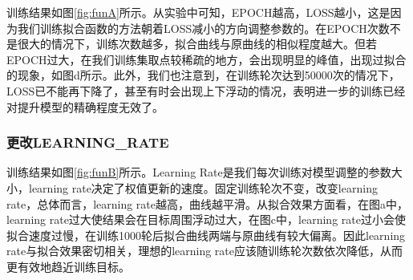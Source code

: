 \documentclass{article}
\begin{document}
训练结果如图\ref{fig:funA}所示。从实验中可知，EPOCH越高，LOSS越小，这是因为我们训练拟合函数的方法朝着LOSS减小的方向调整参数的。在EPOCH次数不是很大的情况下，训练次数越多，拟合曲线与原曲线的相似程度越大。但若EPOCH过大，在我们训练集取点较稀疏的地方，会出现明显的峰值，出现过拟合的现象，如图d所示。此外，我们也注意到，在训练轮次达到50000次的情况下，LOSS已不能再下降了，甚至有时会出现上下浮动的情况，表明进一步的训练已经对提升模型的精确程度无效了。


\subsubsection{更改LEARNING\_RATE}

训练结果如图\ref{fig:funB}所示。Learning Rate是我们每次训练对模型调整的参数大小，learning rate决定了权值更新的速度。固定训练轮次不变，改变learning rate，总体而言，learning rate越高，曲线越平滑。从拟合效果方面看，在图a中，learning rate过大使结果会在目标周围浮动过大，在图c中，learning rate过小会使拟合速度过慢，在训练1000轮后拟合曲线两端与原曲线有较大偏离。因此learning rate与拟合效果密切相关，理想的learning rate应该随训练轮次数依次降低，从而更有效地趋近训练目标。
\end{document}
